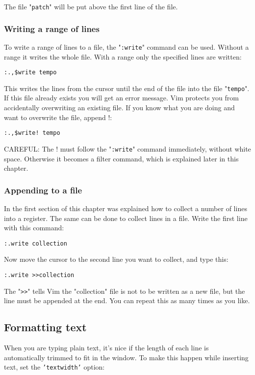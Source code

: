 {The file "\texttt{patch}" will be put above the first line of the file.
\subsubsection{Writing a range of lines}
To write a range of lines to a file, the "\texttt{:write}" command can be used.
Without a range it writes the whole file.
With a range only the specified lines are written:

\begin{Verbatim}[samepage=true]
 :.,$write tempo
\end{Verbatim}

This writes the lines from the cursor until the end of the file into the file "\texttt{tempo}".
If this file already exists you will get an error message.
Vim protects you from accidentally overwriting an existing file.
If you know what you are doing and want to overwrite the file, append !:

\begin{Verbatim}[samepage=true]
 :.,$write! tempo
\end{Verbatim}

CAREFUL: The ! must follow the "\texttt{:write}" command immediately, without white space.
Otherwise it becomes a filter command, which is explained later in this chapter.
\subsubsection{Appending to a file}
In the first section of this chapter was explained how to collect a number of lines into a register.
The same can be done to collect lines in a file.
Write the first line with this command:

\begin{Verbatim}[samepage=true]
 :.write collection
\end{Verbatim}

Now move the cursor to the second line you want to collect, and type this:

\begin{Verbatim}[samepage=true]
 :.write >>collection
\end{Verbatim}

The "\texttt{>>}" tells Vim the "collection" file is not to be written as a new file, but the line must be appended at the end.
You can repeat this as many times as you like.
\subsection{Formatting text}
When you are typing plain text, it's nice if the length of each line is automatically trimmed to fit in the window.
To make this happen while inserting text, set the \texttt{'textwidth'} option:

}
